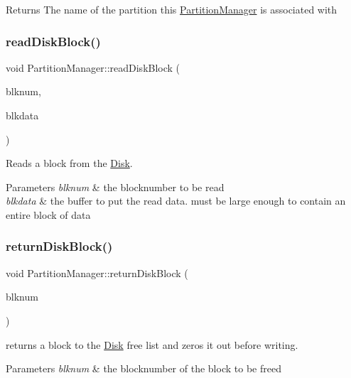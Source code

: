 \begin{DoxyReturn}{Returns}
The name of the partition this \mbox{\hyperlink{classPartitionManager}{Partition\+Manager}} is associated with 
\end{DoxyReturn}
\mbox{\label{classPartitionManager_a7aca34c24770b7b9290c489475655ada}} 
\subsubsection{\texorpdfstring{read\+Disk\+Block()}{readDiskBlock()}}
{\footnotesize\ttfamily void Partition\+Manager\+::read\+Disk\+Block (\begin{DoxyParamCaption}\item[{Blk\+Num\+Type}]{blknum,  }\item[{char $\ast$}]{blkdata }\end{DoxyParamCaption})}

Reads a block from the \mbox{\hyperlink{classDisk}{Disk}}. 
\begin{DoxyParams}{Parameters}
{\em blknum} & the blocknumber to be read \\
\hline
{\em blkdata} & the buffer to put the read data. must be large enough to contain an entire block of data \\
\hline
\end{DoxyParams}
\mbox{\label{classPartitionManager_a3ce9b50aa5e7d9063919fc55d125246b}} 
\subsubsection{\texorpdfstring{return\+Disk\+Block()}{returnDiskBlock()}}
{\footnotesize\ttfamily void Partition\+Manager\+::return\+Disk\+Block (\begin{DoxyParamCaption}\item[{Blk\+Num\+Type}]{blknum }\end{DoxyParamCaption})}

returns a block to the \mbox{\hyperlink{classDisk}{Disk}} free list and zeros it out before writing. 
\begin{DoxyParams}{Parameters}
{\em blknum} & the blocknumber of the block to be freed \\
\hline
\end{DoxyParams}
\mbox{\label{classPartitionManager_a114d5d4f8d90b6e9207b09d99e246bed}} 
